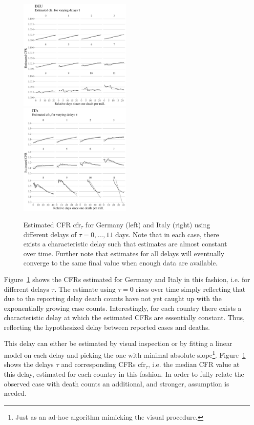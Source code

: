 \documentclass[fullpage,a4paper]{article}
\newcommand{\fig}[1]{Figure~\ref{fig:#1}}
\begin{document}
\begin{figure}
  \includegraphics[width=0.495\textwidth]{../figs/ecdc_cfr_delay_DEU.pdf}
  \includegraphics[width=0.495\textwidth]{../figs/ecdc_cfr_delay_ITA.pdf}
  \caption{\label{fig:cfr} Estimated CFR $\mathrm{cfr}_{\tau}$ for
    Germany (left) and Italy (right) using different delays of $\tau =
    0, \ldots, 11$ days. Note that in each case, there exists a
    characteristic delay such that estimates are almost constant over
    time. Further note that estimates for all delays will eventually
    converge to the same final value when enough data are available.}
\end{figure}
\fig{cfr} shows the CFRs estimated for Germany and Italy in this
fashion, i.e. for different delays $\tau$. The estimate using $\tau =
0$ rises over time simply reflecting that due to the reporting delay
death counts have not yet caught up with the exponentially growing
case counts. Interestingly, for each country there exists a
characteristic delay at which the estimated CFRs are essentially
constant. Thus, reflecting the hypothesized delay between reported
cases and deaths.

This delay can either be estimated by visual inspection or by fitting
a linear model on each delay and picking the one with minimal absolute
slope\footnote{Just as an ad-hoc algorithm mimicking the visual
  procedure.}. \fig{cfr} shows the delays $\tau$ and corresponding
CFRs $\mathrm{cfr}_{\tau}$, i.e. the median CFR value at this delay,
estimated for each country in this fashion. In order to fully relate
the observed case with death counts an additional, and stronger,
assumption is needed.
\end{document}
